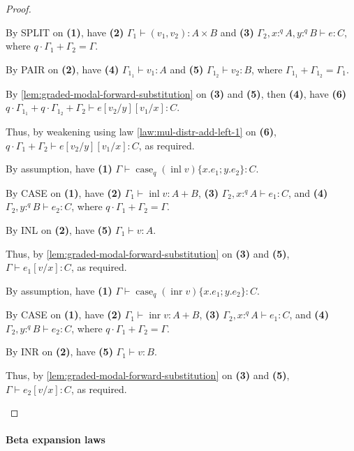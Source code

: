 \documentclass[acmsmall,screen,nonacm]{acmart}
\DeclareMathOperator{\case}{\text{case}}
\DeclareMathOperator{\inl}{\text{inl}}
\DeclareMathOperator{\inr}{\text{inr}}
\newcommand{\tee}{\vdash}
\DeclareMathOperator{\red}{\rightsquigarrow}
\begin{document}
\begin{proof}
\begin{description}
    By SPLIT on \textbf{(1)}, have \textbf{(2)} $\Gamma_1 \tee (v_1, v_2) : A \times B$ and \textbf{(3)} $\Gamma_2, x :^q A, y :^q B \tee e : C$, where $q \cdot \Gamma_1 + \Gamma_2 = \Gamma$.

    By PAIR on \textbf{(2)}, have \textbf{(4)} $\Gamma_{1_1} \tee v_1 : A$ and \textbf{(5)} $\Gamma_{1_2} \tee v_2 : B$, where $\Gamma_{1_1} + \Gamma_{1_2} = \Gamma_1$.

    By \ref{lem:graded-modal-forward-substitution} on \textbf{(3)} and \textbf{(5)}, then \textbf{(4)}, have \textbf{(6)} $q \cdot \Gamma_{1_1} + q \cdot \Gamma_{1_2} + \Gamma_2 \tee e[v_2/y][v_1/x] : C$.

    Thus, by weakening using law \ref{law:mul-distr-add-left-1} on \textbf{(6)}, $q \cdot \Gamma_1 + \Gamma_2 \tee e[v_2/y][v_1/x] : C$, as required.
    \\
    \item[\mbox{Case $\case_q (\inl v) \{x.e_1; y.e_2\} \red e_1[v/x] : A$}.] 
    By assumption, have \textbf{(1)} $\Gamma \tee \case_q (\inl v) \{x.e_1; y.e_2\} : C$.

    By CASE on \textbf{(1)}, have \textbf{(2)} $\Gamma_1 \tee \inl v : A + B$, \textbf{(3)} $\Gamma_2, x :^q A \tee e_1 : C$, and \textbf{(4)} $\Gamma_2, y :^q B \tee e_2 : C$, where $q \cdot \Gamma_1 + \Gamma_2 = \Gamma$.

    By INL on \textbf{(2)}, have \textbf{(5)} $\Gamma_1 \tee v : A$.

    Thus, by \ref{lem:graded-modal-forward-substitution} on \textbf{(3)} and \textbf{(5)}, $\Gamma \tee e_1[v/x] : C$, as required.
    \\
    \item[\mbox{Case $\case_q (\inr v) \{x.e_1; y.e_2\} \red e_2[v/x] : A$}.] 
    By assumption, have \textbf{(1)} $\Gamma \tee \case_q (\inr v) \{x.e_1; y.e_2\} : C$.

    By CASE on \textbf{(1)}, have \textbf{(2)} $\Gamma_1 \tee \inr v : A + B$, \textbf{(3)} $\Gamma_2, x :^q A \tee e_1 : C$, and \textbf{(4)} $\Gamma_2, y :^q B \tee e_2 : C$, where $q \cdot \Gamma_1 + \Gamma_2 = \Gamma$.

    By INR on \textbf{(2)}, have \textbf{(5)} $\Gamma_1 \tee v : B$.

    Thus, by \ref{lem:graded-modal-forward-substitution} on \textbf{(3)} and \textbf{(5)}, $\Gamma \tee e_2[v/x] : C$, as required.
  \end{description}
\end{proof}

\paragraph{Beta expansion laws}
\end{document}
